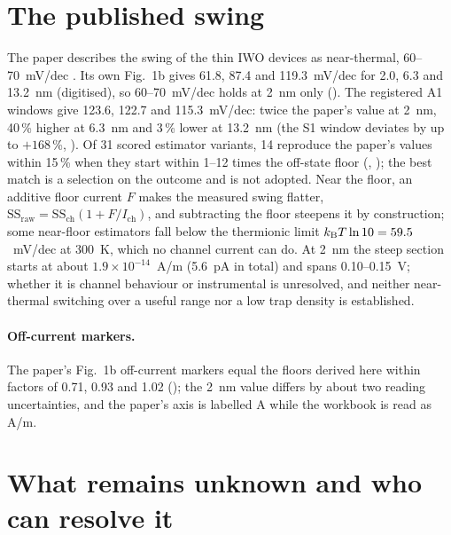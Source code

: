 \section{The published swing}
\label{sec:mono-prov-ss}

The paper describes the swing of the thin IWO devices as near-thermal, 60--70~mV/dec \citep[p.~3]{Januar2026}. Its own Fig.~1b gives 61.8, 87.4 and 119.3~mV/dec for
2.0, 6.3 and 13.2~nm (digitised), so 60--70~mV/dec holds at 2~nm only (). The registered A1 windows give
123.6, 122.7 and 115.3~mV/dec: twice the paper's value at 2~nm, 40\,\% higher at 6.3~nm and 3\,\% lower at 13.2~nm (the
S1 window deviates by up to $+168$\,\%, ). Of 31 scored estimator variants, 14 reproduce the paper's values
within 15\,\% when they start within 1--12 times the off-state floor (, ); the best match is a
selection on the outcome and is not adopted. Near the floor, an additive floor current $F$ makes the measured swing
flatter, $\mathrm{SS}_{\mathrm{raw}} = \mathrm{SS}_{\mathrm{ch}}(1+F/I_{\mathrm{ch}})$, and subtracting the floor steepens
it by construction; some near-floor estimators fall below the thermionic limit $k_{\mathrm{B}}T\ln10 = 59.5$~mV/dec at 300~K, which
no channel current can do. At 2~nm the steep section starts at about $1.9\times10^{-14}$~A/\textmu m (5.6~pA in total)
and spans 0.10--0.15~V; whether it is channel behaviour or instrumental is unresolved, and neither near-thermal
switching over a useful range nor a low trap density is established.

\paragraph{Off-current markers.} The paper's Fig.~1b off-current markers equal the floors derived here within factors
of 0.71, 0.93 and 1.02 (); the 2~nm value differs by about two reading uncertainties, and the paper's axis
is labelled A while the workbook is read as A/\textmu m.

\section{What remains unknown and who can resolve it}
\label{sec:mono-prov-open}

